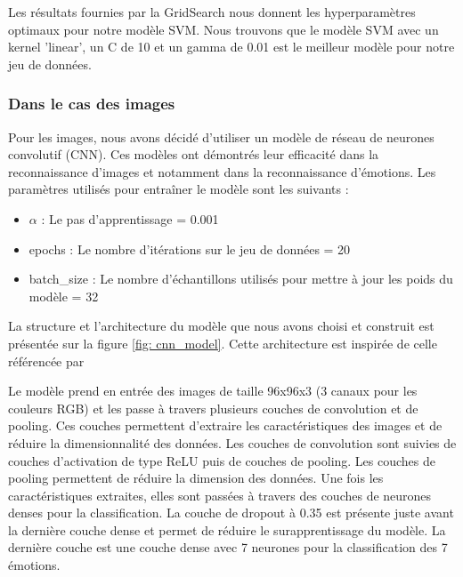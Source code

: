 \documentclass{rapport}
\begin{document}
Les résultats fournies par la GridSearch nous donnent les hyperparamètres optimaux pour notre modèle SVM. Nous trouvons
que le modèle SVM avec un kernel 'linear', un C de 10 et un gamma de 0.01 est le meilleur modèle pour notre jeu de données.

\subsubsection{Dans le cas des images}
Pour les images, nous avons décidé d'utiliser un modèle de réseau de neurones convolutif (CNN). Ces modèles ont démontrés
leur efficacité dans la reconnaissance d'images et notamment dans la reconnaissance d'émotions. Les paramètres utilisés pour
entraîner le modèle sont les suivants :

\begin{itemize}
    \item $\alpha$ : Le pas d'apprentissage = 0.001
    \item epochs : Le nombre d'itérations sur le jeu de données = 20
    \item batch\_size : Le nombre d'échantillons utilisés pour mettre à jour les poids du modèle = 32\\
\end{itemize}

La structure et l'architecture du modèle que nous avons choisi et construit est présentée sur la figure \ref*{fig: cnn_model}.
Cette architecture est inspirée de celle référencée par \cite{agungImagebasedFacialEmotion2024}\\


Le modèle prend en entrée des images de taille 96x96x3 (3 canaux pour les couleurs RGB) et les passe à travers plusieurs couches de convolution
et de pooling. Ces couches permettent d'extraire les caractéristiques des images et de réduire la dimensionnalité des données. Les couches
de convolution sont suivies de couches d'activation de type ReLU puis de couches de pooling. Les couches de pooling permettent de réduire la
dimension des données. Une fois les caractéristiques extraites, elles sont passées à travers des couches de neurones denses pour la classification.
La couche de dropout à 0.35 est présente juste avant la dernière couche dense et permet de réduire le surapprentissage du modèle. La dernière couche
est une couche dense avec 7 neurones pour la classification des 7 émotions.\\
\end{document}
